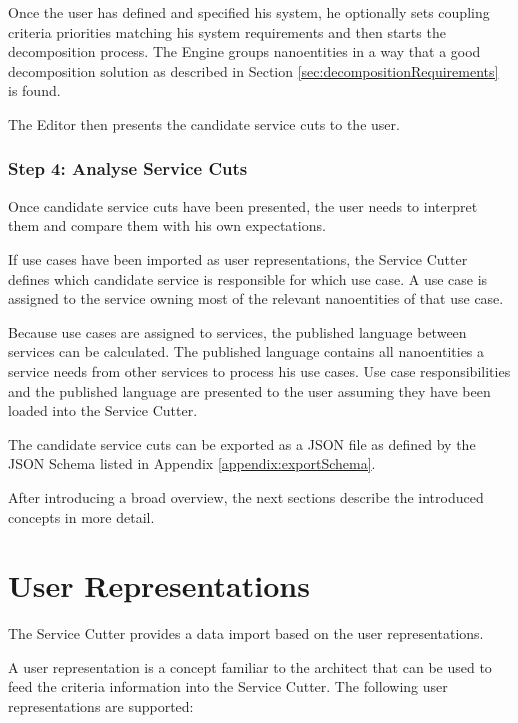 Once the user has defined and specified his system, he optionally sets coupling criteria priorities matching his system requirements and then starts the decomposition process. The Engine groups nanoentities in a way that a good decomposition solution as described in Section \ref{sec:decompositionRequirements} is found. 

The Editor then presents the candidate service cuts to the user.

\subsubsection{Step 4: Analyse Service Cuts}

Once candidate service cuts have been presented, the user needs to interpret them and compare them with his own expectations. 

If use cases have been imported as user representations, the Service Cutter defines which candidate service is responsible for which use case. A use case is assigned to the service owning most of the relevant nanoentities of that use case. 

Because use cases are assigned to services, the published language between services can be calculated. The published language contains all nanoentities a service needs from other services to process his use cases. Use case responsibilities and the published language are presented to the user assuming they have been loaded into the Service Cutter. 

The candidate service cuts can be exported as a \gls{JSON} file as defined by the \gls{JSON} Schema listed in Appendix \ref{appendix:exportSchema}.

\bigskip

After introducing a broad overview, the next sections describe the introduced concepts in more detail. 
 
 \section{User Representations}
 \label{sec:dataImport}
 
 The Service Cutter provides a data import based on the user representations.
 
 A user representation is a concept familiar to the architect that can be used to feed the criteria information into the Service Cutter. The following user representations are supported:
 
